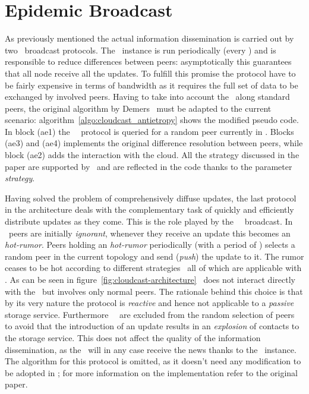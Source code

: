 \section{Epidemic Broadcast}
As previously mentioned the actual information dissemination is
carried out by two \epidemic\ broadcast protocols. The
\antientropy\ instance is run periodically (every \deltaAntiEntropy)
and is responsible to
reduce differences between peers: asymptotically this guarantees that
all node receive all the updates. To fulfill this promise the
protocol have to be fairly expensive in terms of bandwidth as it
requires the full set of data to be exchanged by involved
peers. Having to take into account the \cloud\ along standard peers,
the original algorithm by Demers~\cite{EpidemicAlgorithms} must be
adapted to the current scenario:
algorithm~\ref{algo:cloudcast_antietropy} shows the modified pseudo
code.
In block (ae1) the \cloudcast\ \peersampling\ protocol is queried
for a random peer currently in \view. Blocks (ae3) and (ae4)
implements the original difference resolution between peers, while
block (ae2) adds the interaction with the cloud.
All the strategy discussed in the paper are supported by
\cloudcast\ and are reflected in the code thanks to the parameter
\emph{strategy}.



Having solved the problem of comprehensively diffuse updates, the last
protocol in the architecture deals with the complementary task of
quickly and efficiently distribute updates as they come. This is the
role played by the \rumormongering\ \epidemic\ broadcast.
In \rumormongering\ peers are initially \emph{ignorant}, whenever they
receive an update this becomes an \emph{hot-rumor}. Peers holding an
\emph{hot-rumor} periodically (with a period of \deltaRumorMongering)
selects a random peer in the current
topology and send (\emph{push}) the update to it. The rumor ceases to
be hot according to different strategies~\cite{EpidemicAlgorithms}
 all of which are applicable with \cloudcast.
As can be seen in figure~\ref{fig:cloudcast-architecture} \rumormongering\
does not interact directly with the \cloud\ but involves only normal
peers. The rationale behind this choice is that by its very nature the
protocol is \emph{reactive} and hence not applicable to a
\emph{passive} storage service. Furthermore \cloud\ \descriptor\ are
excluded from the random selection of peers to avoid that the
introduction of an update results in an \emph{explosion} of contacts
to the storage service. This does not affect the quality of the
information dissemination, as the \cloud\ will in any case receive the
news thanks to the \antientropy\ instance.
The algorithm for this protocol is omitted, as it doesn't need any
modification to be adopted in \cloudcast; for more information on the
implementation refer to the original paper\cite{EpidemicAlgorithms}.

